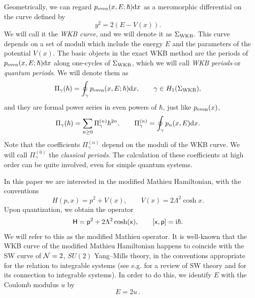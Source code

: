\documentclass[a4paper,11pt]{article}
\theoremstyle{definition}
\newcommand{\ri}{{\rm i}}
\newcommand{\rd}{{\rm d}}
\newcommand{\mx}{\mathsf{x}}
\newcommand{\mm}{\mathsf{p}}
\newcommand{\mH}{\mathsf{H}}
\newcommand{\be}{\begin{equation}}
\newcommand{\ee}{\end{equation}}
\begin{document}
Geometrically, we can regard $p_{\rm even}(x, E;\hbar) \rd x$ as a
meromorphic differential on the curve defined by
%
\be
\label{wkb-curve} 
y^2 = 2(E- V(x)). 
\ee
%
We will call it the {\it WKB curve}, and we will denote it as
$\Sigma_{\rm WKB}$.  This curve depends on a set of moduli which
include the energy $E$ and the parameters of the potential $V(x)$. The
basic objects in the exact WKB method are the periods of
$p_{\rm even} (x, E;\hbar) \rd x$ along one-cycles of
$\Sigma_{\rm WKB}$, which we will call {\it WKB periods} or {\it
  quantum periods}. We will denote them as
%
\be
\Pi_\gamma(\hbar)= \oint_\gamma p_{\rm even} (x,E;\hbar) \rd x, \qquad \gamma \in H_1(\Sigma_{\rm WKB}), 
\ee
%   
and they are formal power series in even powers of $\hbar$, just like
$p_{\rm even}(x)$,
%
\be
\label{pi-wkb-expansion}
\Pi_\gamma(\hbar)=\sum_{n \ge 0} \Pi^{(n)}_\gamma \hbar^{2n}, \qquad
\Pi^{(n)}_\gamma = \oint_\gamma p_n(x, E) \rd x.  
\ee
%
Note that the coefficients $ \Pi^{(n)}_\gamma$ depend on the moduli of
the WKB curve. We will call $\Pi^{(0)}_\gamma$ the {\it classical
  periods}. The calculation of these coefficients at high order can be
quite involved, even for simple quantum systems.

In this paper we are interested in the modified Mathieu Hamiltonian,
with the conventions
%
\begin{equation}
  H(p,x) =p^2+V(x), \qquad  V(x)= 2\Lambda^2 \cosh x.
\label{eq:su2curve}
\end{equation}
%
Upon quantization, we obtain the operator 
%
\be
\label{eq:schrodinger}
\mH= \mm^2+ 2 \Lambda^2 \cosh(\mx), \qquad [\mx, \mm]= \ri \hbar. 
\ee
%
We will refer to this as the modified Mathieu operator. It is
well-known that the WKB curve of the modified Mathieu Hamiltonian
happens to coincide with the SW curve of ${\cal N}=2$, $SU(2)$
Yang--Mills theory, in the conventions appropriate for the relation to
integrable systems (see e.g. \cite{lerche-rev} for a review of SW
theory and \cite{swbook} for its connection to integrable
systems). In order to do this, we identify $E$ with the Coulomb
modulus $u$ by
%
\begin{equation}
  E = 2u \ .
\end{equation}
%
\end{document}
